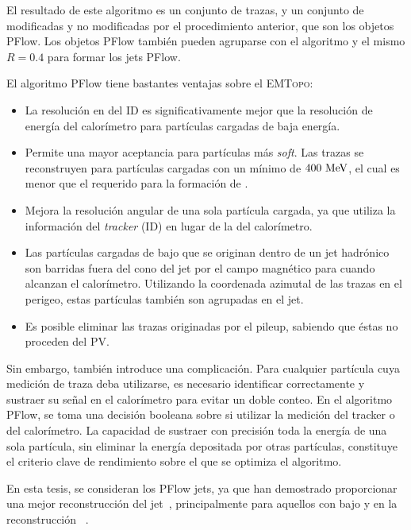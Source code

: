 El resultado de este algoritmo es un conjunto de trazas, y un conjunto de \topos modificadas y no modificadas por el procedimiento anterior, que son los objetos \ac{PFlow}. Los objetos \ac{PFlow} también pueden agruparse con el algoritmo \antikt y el mismo \(R=0.4\) para formar los jets \ac{PFlow}.

El algoritmo \ac{PFlow} tiene bastantes ventajas sobre el \textsc{EMTopo}:
\begin{itemize}
    \item La resolución en \pt del \ac{ID} es significativamente mejor que la resolución de energía del calorímetro para partículas cargadas de baja energía.
    \item Permite una mayor aceptancia para partículas más \textit{soft}. Las trazas se reconstruyen para partículas cargadas con un mínimo \pt de \(400~\text{MeV}\), el cual es menor que el requerido para la formaci\'on de \topos.
    \item Mejora la resolución angular de una sola partícula cargada, ya que utiliza la información del \textit{tracker} (\acf{ID}) en lugar de la del calorímetro.
    \item Las partículas cargadas de bajo \pt que se originan dentro de un jet hadrónico son barridas fuera del cono del jet por el campo magnético para cuando alcanzan el calorímetro. Utilizando la coordenada azimutal de las trazas en el perigeo, estas partículas tambi\'en son agrupadas en el jet.
    \item Es posible eliminar las trazas originadas por el pileup, sabiendo que éstas no proceden del \ac{PV}.
\end{itemize}

Sin embargo, tambi\'en introduce una complicación. Para cualquier partícula cuya medición de traza deba utilizarse, es necesario identificar correctamente y sustraer su señal en el calorímetro para evitar un doble conteo. En el algoritmo \ac{PFlow}, se toma una decisión booleana sobre si utilizar la medición del tracker o del calorímetro. La capacidad de sustraer con precisión toda la energía de una sola partícula, sin eliminar la energía depositada por otras partículas, constituye el criterio clave de rendimiento sobre el que se optimiza el algoritmo.

En esta tesis, se consideran los \ac{PFlow} jets, ya que han demostrado proporcionar una mejor reconstrucción del jet~\cite{ATLAS-JetPFlow-Performance}, principalmente para aquellos con bajo \pt y en la reconstrucción \met~\cite{ATLAS-MET-Performance-2016}.


